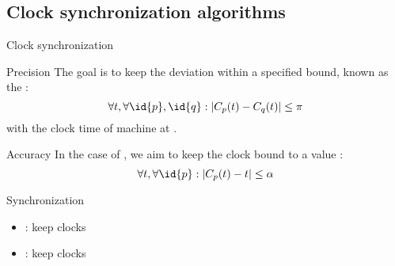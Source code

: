 \subsection{Clock synchronization algorithms}
\begin{slide}{Clock synchronization}
  \begin{block}{Precision}
    The goal is to keep the deviation  within a specified bound,
    known as the  \mathexpr{\pi}:
    \[ \forall t, \forall \id{p},\id{q}: |C_p(t) - C_q(t)| \leq \pi \]
    with  the  clock time of machine  at  . 
  \end{block}
  \begin{block}{Accuracy}
    In the case of , we aim to keep the clock bound to a value \mathexpr{\alpha}:
    \[ \forall t, \forall \id{p}: |C_p(t) - t| \leq \alpha \]
  \end{block}
  \begin{alertblock}{Synchronization}
    \begin{itemize}\tightlist
    \item {}: keep clocks 
    \item {}: keep clocks 
    \end{itemize}
  \end{alertblock}
\end{slide}

